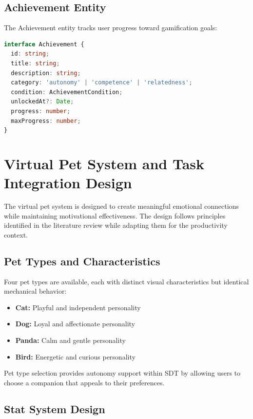 \subsection{Achievement Entity}

The Achievement entity tracks user progress toward gamification goals:

\begin{lstlisting}[language=TypeScript, caption=Achievement Interface Definition]
interface Achievement {
  id: string;
  title: string;
  description: string;
  category: 'autonomy' | 'competence' | 'relatedness';
  condition: AchievementCondition;
  unlockedAt?: Date;
  progress: number;
  maxProgress: number;
}
\end{lstlisting}

\section{Virtual Pet System and Task Integration Design}
\label{sec:pet-system-design}

\completed

The virtual pet system is designed to create meaningful emotional connections while maintaining motivational effectiveness. The design follows principles identified in the literature review while adapting them for the productivity context.

\subsection{Pet Types and Characteristics}

Four pet types are available, each with distinct visual characteristics but identical mechanical behavior:

\begin{itemize}
    \item \textbf{Cat:} Playful and independent personality
    \item \textbf{Dog:} Loyal and affectionate personality
    \item \textbf{Panda:} Calm and gentle personality
    \item \textbf{Bird:} Energetic and curious personality
\end{itemize}

Pet type selection provides autonomy support within SDT by allowing users to choose a companion that appeals to their preferences.

\subsection{Stat System Design}

